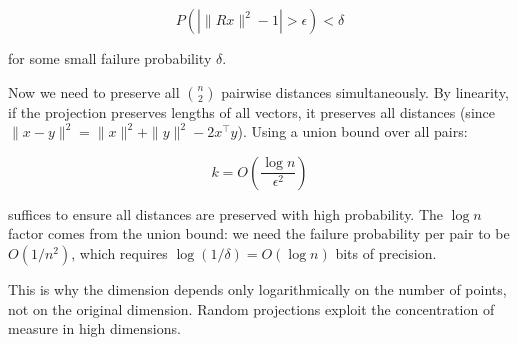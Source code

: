 \begin{equation}
P(|\|Rx\|^2 - 1| > \epsilon) < \delta
\end{equation}

for some small failure probability $\delta$.

\vspace{1em}

Now we need to preserve all $\binom{n}{2}$ pairwise distances simultaneously. By linearity, if the projection preserves lengths of all vectors, it preserves all distances (since $\|x - y\|^2 = \|x\|^2 + \|y\|^2 - 2x^\top y$). Using a union bound over all pairs:

\begin{equation}
k = O\left(\frac{\log n}{\epsilon^2}\right)
\end{equation}

suffices to ensure all distances are preserved with high probability. The $\log n$ factor comes from the union bound: we need the failure probability per pair to be $O(1/n^2)$, which requires $\log(1/\delta) = O(\log n)$ bits of precision.

\vspace{1em}

This is why the dimension depends only logarithmically on the number of points, not on the original dimension. Random projections exploit the concentration of measure in high dimensions.

\vspace{1.5em}

